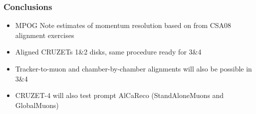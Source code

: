 \documentclass[compress]{beamer}
\begin{document}
\begin{frame}
\frametitle{Conclusions}
\begin{itemize}\setlength{\itemsep}{0.75 cm}
\item MPOG Note estimates of momentum resolution based on from CSA08 alignment exercises

\item Aligned CRUZETs 1\&2 disks, same procedure ready for 3\&4

\item Tracker-to-muon and chamber-by-chamber alignments will also be possible in 3\&4

\item CRUZET-4 will also test prompt AlCaReco (StandAloneMuons and GlobalMuons)
\end{itemize}
\label{numpages}
\end{frame}
\end{document}
